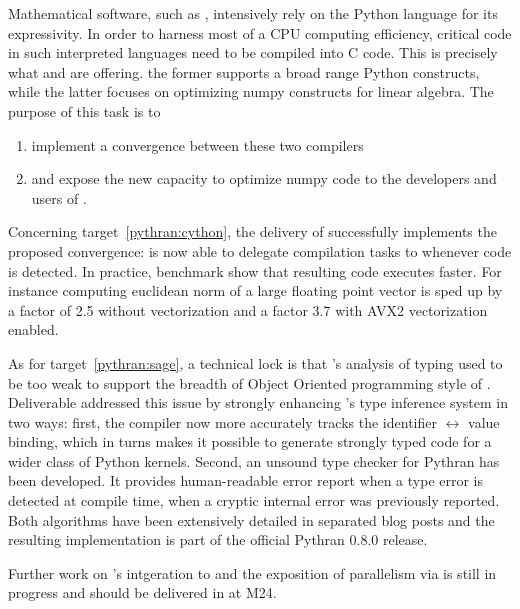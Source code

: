 \documentclass{deliverablereport}
\begin{document}
Mathematical software, such as \Sage, intensively rely on the Python
language for its expressivity. In order to harness most of a CPU computing
efficiency, critical code in such interpreted languages need to be compiled into
C code. This is precisely what \Cython and \Pythran are offering. the former
supports a broad range Python constructs, while the latter focuses on optimizing
numpy constructs for linear algebra.
The purpose of this task is to
\begin{enumerate}
\item\label{pythran:cython} implement a convergence between these two compilers
\item\label{pythran:sage} and expose the new capacity to optimize numpy code to the developers and
  users of \Sage.  
\end{enumerate}

Concerning target~\ref{pythran:cython}, the delivery of  successfully implements the
proposed convergence: \Cython is now able to delegate compilation tasks to
\Pythran whenever \Numpy code is detected. In practice, benchmark show that
resulting code executes faster. For instance computing euclidean norm of a large
floating point vector is sped up by a factor of 2.5 without vectorization and
a factor 3.7 with AVX2 vectorization enabled.

As for target~\ref{pythran:sage}, a technical lock is that \Pythran's analysis
of \Python typing used to be too weak to support the breadth of Object Oriented
programming style of \Sage. Deliverable 
addressed this issue by strongly enhancing \Pythran's type inference system in two ways: first, the compiler now more accurately tracks the identifier
$\leftrightarrow$ value binding, which in turns makes it possible to generate strongly
typed code for a wider class of Python kernels.  Second, an unsound type checker for
Pythran has been developed. It provides human-readable error report when a type error is
detected at compile time, when a cryptic internal error was previously reported. Both
algorithms have been extensively detailed in separated blog posts and the resulting
implementation is part of the official Pythran 0.8.0 release.

Further work on \Pythran's intgeration to \Sage and the exposition of
parallelism via  is still in progress and should be delivered in
 at M24.

  \paragraph{}
  
\end{document}
